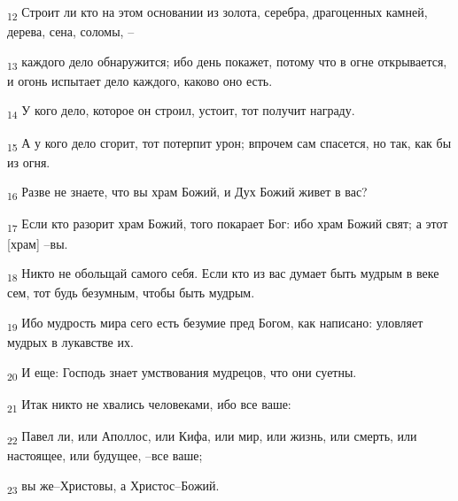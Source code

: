 \begin{tcolorbox}
\textsubscript{12} Строит ли кто на этом основании из золота, серебра, драгоценных камней, дерева, сена, соломы, --
\end{tcolorbox}
\begin{tcolorbox}
\textsubscript{13} каждого дело обнаружится; ибо день покажет, потому что в огне открывается, и огонь испытает дело каждого, каково оно есть.
\end{tcolorbox}
\begin{tcolorbox}
\textsubscript{14} У кого дело, которое он строил, устоит, тот получит награду.
\end{tcolorbox}
\begin{tcolorbox}
\textsubscript{15} А у кого дело сгорит, тот потерпит урон; впрочем сам спасется, но так, как бы из огня.
\end{tcolorbox}
\begin{tcolorbox}
\textsubscript{16} Разве не знаете, что вы храм Божий, и Дух Божий живет в вас?
\end{tcolorbox}
\begin{tcolorbox}
\textsubscript{17} Если кто разорит храм Божий, того покарает Бог: ибо храм Божий свят; а этот [храм] --вы.
\end{tcolorbox}
\begin{tcolorbox}
\textsubscript{18} Никто не обольщай самого себя. Если кто из вас думает быть мудрым в веке сем, тот будь безумным, чтобы быть мудрым.
\end{tcolorbox}
\begin{tcolorbox}
\textsubscript{19} Ибо мудрость мира сего есть безумие пред Богом, как написано: уловляет мудрых в лукавстве их.
\end{tcolorbox}
\begin{tcolorbox}
\textsubscript{20} И еще: Господь знает умствования мудрецов, что они суетны.
\end{tcolorbox}
\begin{tcolorbox}
\textsubscript{21} Итак никто не хвались человеками, ибо все ваше:
\end{tcolorbox}
\begin{tcolorbox}
\textsubscript{22} Павел ли, или Аполлос, или Кифа, или мир, или жизнь, или смерть, или настоящее, или будущее, --все ваше;
\end{tcolorbox}
\begin{tcolorbox}
\textsubscript{23} вы же--Христовы, а Христос--Божий.
\end{tcolorbox}
